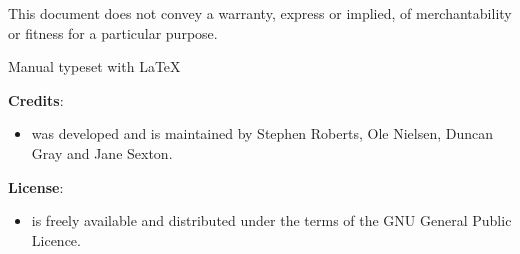 This document does not convey a warranty, express or implied,
of merchantability or fitness for a particular purpose.

\begin{center}
   \anuga

   Manual typeset with \LaTeX
\end{center}

\newpage

\textbf{Credits}:
\begin{itemize}
\item \anuga was developed and is maintained by Stephen Roberts,
  Ole Nielsen, Duncan Gray and Jane Sexton.
\end{itemize}

\textbf{License}:
\begin{itemize}
\item \anuga is freely available and distributed under the terms of the GNU General Public Licence.
\end{itemize}
